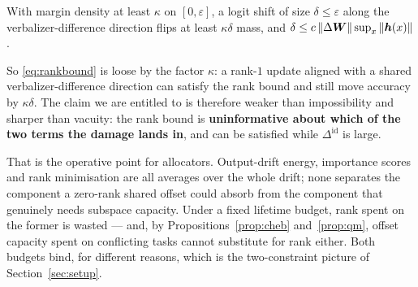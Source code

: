 \begin{proposition}
\label{prop:amp}
With margin density at least $\kappa$ on $[0,\varepsilon]$, a logit shift of size
$\delta\le\varepsilon$ along the verbalizer-difference direction flips at least
$\kappa\delta$ mass, and $\delta\le c\,\|\Delta\bm{W}\|\sup_x\|\bm{h}(x)\|$.
\end{proposition}

So \eqref{eq:rankbound} is loose by the factor $\kappa$: a rank-$1$ update aligned
with a shared verbalizer-difference direction can satisfy the rank bound and still
move accuracy by $\kappa\delta$. The claim we are entitled to is therefore weaker
than impossibility and sharper than vacuity: the rank bound is
\textbf{uninformative about which of the two terms the damage lands in}, and can be
satisfied while $\Delta^{\mathrm{id}}$ is large.

That is the operative point for allocators. Output-drift energy, importance scores
and rank minimisation are all averages over the whole drift; none separates the
component a zero-rank shared offset could absorb from the component that genuinely
needs subspace capacity. Under a fixed lifetime budget, rank spent on the former is
wasted --- and, by Propositions~\ref{prop:cheb} and~\ref{prop:qm}, offset capacity
spent on conflicting tasks cannot substitute for rank either. Both budgets bind,
for different reasons, which is the two-constraint picture of
Section~\ref{sec:setup}.